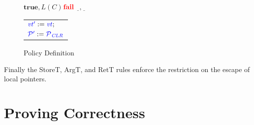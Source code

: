 \documentclass{article}
\begin{document}
\begin{figure}
\begin{minipage}{0.5\textwidth}
\end{minipage}
\begin{minipage}{0.5\textwidth}
  
             {
               {\(\mathbf{true},L(C)\)}{\(\fail\)}
               {\(\underline{~~},\underline{~~}\)}{\begin{tabular}{l}
                   \(\vt['] := \vt;\) \\
                   \(\PCT['] := \PCT[_{CLR}]\) \\
             \end{tabular}}}
\end{minipage}
\begin{minipage}{0.3\textwidth}
  \binoptruleblock{
    \caseofthree{\(\vt[_1], \vt[_2]\)}
                {\(\emptyset,\emptyset\)}{\(\emptyset\)}
                {\(\vt,\emptyset\) \\ \(\emptyset, \vt\)}{\(\vt['] := \vt\)}
                {\(\underline{~~}, \underline{~~}\)}{\(\fail\)}
  }
\end{minipage}

\caption{Policy Definition}
\label{fig:policy}

\end{figure}

Finally the StoreT, ArgT, and RetT rules enforce the restriction on the escape of local pointers.
  
\section{Proving Correctness}
\end{document}
